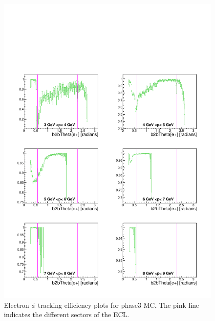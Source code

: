 \documentclass[a4paper,11pt,twosided,final,german,openbib,pdftex,listof=totoc,bibliography=totoc]{scrbook}
\begin{document}
\begin{appendix}
\clearpage





\begin{figure}[!htbp]
	\centering
	\includegraphics[width=\textwidth]{Plots/master3/xPMThetaem_MCP3}
	\caption[Momentum $\theta$ Electron Efficiency Phase3 MC]{Electron $\phi$ tracking efficiency plots for phase3 MC. The pink line indicates the different sectors of the ECL.}
	\label{plt:PMThetaem3_MC}
\end{figure}



\end{appendix}
\end{document}
